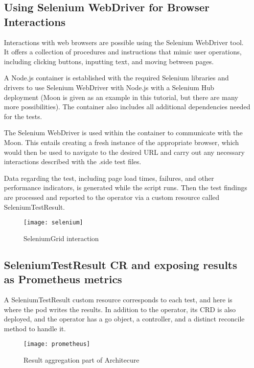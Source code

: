 \subsection{Using Selenium WebDriver for Browser Interactions}

Interactions with web browsers are possible using the Selenium WebDriver tool. It offers a collection of procedures and instructions that mimic user operations, including clicking buttons, inputting text, and moving between pages.

A Node.js container is established with the required Selenium libraries and drivers to use Selenium WebDriver with Node.js with a Selenium Hub deployment (Moon is given as an example in this tutorial, but there are many more possibilities). The container also includes all additional dependencies needed for the tests.

The Selenium WebDriver is used within the container to communicate with the Moon. This entails creating a fresh instance of the appropriate browser, which would then be used to navigate to the desired URL and carry out any necessary interactions described with the .side test files.

Data regarding the test, including page load times, failures, and other performance indicators, is generated while the script runs. Then the test findings are processed and reported to the operator via a custom resource called SeleniumTestResult.

\begin{figure}[H]
	\centering
	\texttt{[image: selenium]}
	\label{fig:selenium}
	\caption{SeleniumGrid interaction}
\end{figure}

\subsection{SeleniumTestResult CR and exposing results as Prometheus metrics}

A SeleniumTestResult custom resource corresponds to each test, and here is where the pod writes the results. In addition to the operator, its CRD is also deployed, and the operator has a go object, a controller, and a distinct reconcile method to handle it.

\begin{figure}[H]
	\centering
	\texttt{[image: prometheus]}
	\label{fig:prometheus}
	\caption{Result aggregation part of Architecure}
\end{figure}

